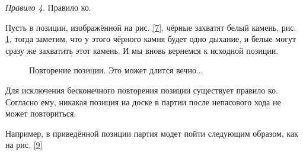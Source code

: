 \documentclass[14pt,a4paper]{extarticle}
\newcommand{\stone}[3]{\filldraw[color=black, fill=#3, very thick](#1,#2) circle(0.45);}
\newcommand{\stonelabel}[4]{\node[text=#3] at (#1,#2) {#4};}
\begin{document}
\textit{Правило 4.} Правило ко.

Пусть в позиции, изображённой на рис. \ref{7}, чёрные захватят белый камень, рис. \ref{8}, тогда заметим, что у этого чёрного камня будет одно дыхание, и белые могут сразу же захватить этот камень. И мы вновь вернемся к исходной позиции.

\begin{figure}[h!]
    \centering
    \begin{subfigure}{0.4\textwidth}
    \end{subfigure}
    \hfill
    \begin{subfigure}{0.4\textwidth}
    \end{subfigure}
    \caption{Повторение позиции. Это может длится вечно...}
    \label{8}
\end{figure}

Для исключения бесконечного повторения позиции существует правило ко.
Согласно ему, никакая позиция на доске в партии после непасового хода не может повториться.

Например, в приведённой позиции партия модет пойти следующим образом, как на рис. \ref{9}
\end{document}
